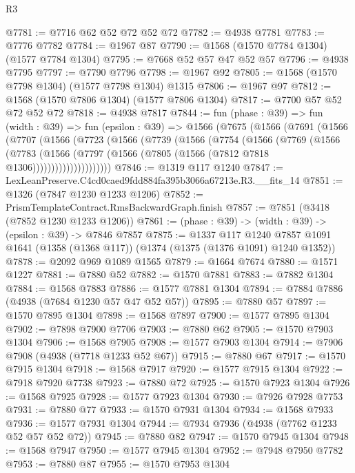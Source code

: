 \begin{lexlean}{R3}
\begin{coremodule}
@7781 := @7716 @62 @52 @72 @52 @72
@7782 := @4938 @7781
@7783 := @7776 @7782
@7784 := @1967 @87
@7790 := @1568 (@1570 @7784 @1304) (@1577 @7784 @1304)
@7795 := @7668 @52 @57 @47 @52 @57
@7796 := @4938 @7795
@7797 := @7790 @7796
@7798 := @1967 @92
@7805 := @1568 (@1570 @7798 @1304) (@1577 @7798 @1304) @1315
@7806 := @1967 @97
@7812 := @1568 (@1570 @7806 @1304) (@1577 @7806 @1304)
@7817 := @7700 @57 @52 @72 @52 @72
@7818 := @4938 @7817
@7844 := fun (phase : @39) =>
  fun (width : @39) =>
  fun (epsilon : @39) =>
  @1566
    (@7675
      (@1566
        (@7691
          (@1566
            (@7707
              (@1566
                (@7723
                  (@1566
                    (@7739
                      (@1566
                        (@7754
                          (@1566
                            (@7769
                              (@1566
                                (@7783
                                  (@1566
                                    (@7797
                                      (@1566 (@7805 (@1566 (@7812 @7818 @1306)))))))))))))))))))))
@7846 := @1319 @117 @1240
@7847 := LexLeanPreserve.C4cd0caed9fdd884fa395b3066a67213e.R3.__fits_14
@7851 := @1326 (@7847 @1230 @1233 @1206)
@7852 := PrismTemplateContract.RmsBackwardGraph.finish
@7857 := @7851 (@3418 (@7852 @1230 @1233 @1206))
@7861 := (phase : @39) -> (width : @39) -> (epsilon : @39) -> @7846 @7857
@7875 := @1337
    @117
    @1240
    @7857
    @1091
    @1641
    (@1358 (@1368 @117))
    (@1374 (@1375 (@1376 @1091) @1240 @1352))
@7878 := @2092 @969 @1089 @1565
@7879 := @1664 @7674
@7880 := @1571 @1227
@7881 := @7880 @52
@7882 := @1570 @7881
@7883 := @7882 @1304
@7884 := @1568 @7883
@7886 := @1577 @7881 @1304
@7894 := @7884 @7886 (@4938 (@7684 @1230 @57 @47 @52 @57))
@7895 := @7880 @57
@7897 := @1570 @7895 @1304
@7898 := @1568 @7897
@7900 := @1577 @7895 @1304
@7902 := @7898 @7900 @7706
@7903 := @7880 @62
@7905 := @1570 @7903 @1304
@7906 := @1568 @7905
@7908 := @1577 @7903 @1304
@7914 := @7906 @7908 (@4938 (@7718 @1233 @52 @67))
@7915 := @7880 @67
@7917 := @1570 @7915 @1304
@7918 := @1568 @7917
@7920 := @1577 @7915 @1304
@7922 := @7918 @7920 @7738
@7923 := @7880 @72
@7925 := @1570 @7923 @1304
@7926 := @1568 @7925
@7928 := @1577 @7923 @1304
@7930 := @7926 @7928 @7753
@7931 := @7880 @77
@7933 := @1570 @7931 @1304
@7934 := @1568 @7933
@7936 := @1577 @7931 @1304
@7944 := @7934 @7936 (@4938 (@7762 @1233 @52 @57 @52 @72))
@7945 := @7880 @82
@7947 := @1570 @7945 @1304
@7948 := @1568 @7947
@7950 := @1577 @7945 @1304
@7952 := @7948 @7950 @7782
@7953 := @7880 @87
@7955 := @1570 @7953 @1304

\end{coremodule}
\end{lexlean}
